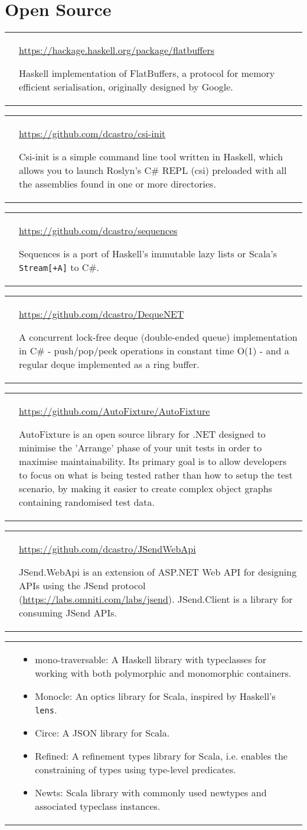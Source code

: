 \documentclass[12pt,a4paper,sans]{moderncv}        %
\makeatletter
\newcommand*{\para}{\vspace{.7ex}\newline}
\newcommand*{\project}[3]{
  \cvitem{\textbf{#1}}{
    \barelink{#2}
    \para
    #3
    }
}
\newcommand*{\code}{\texttt}
\newcommand*{\barelink}[1]{\protect\href{#1}{#1}}
\newcommand*{\cvitemspace}{1em}
\renewcommand*{\cvitem}[3][\cvitemspace]{%
  \begin{tabular}{@{}p{\hintscolumnwidth}@{\hspace{\separatorcolumnwidth}}p{\maincolumnwidth}@{}}%
    \raggedleft\hintstyle{#2} &{#3}%
  \end{tabular}%
  \par\addvspace{#1}}
\makeatother
\begin{document}
\section{Open Source}
\project{haskell-flatbuffers}{https://hackage.haskell.org/package/flatbuffers}{
  Haskell implementation of FlatBuffers, a protocol for memory efficient
  serialisation, originally designed by Google.
}
\project{csi-init}{https://github.com/dcastro/csi-init}{
  Csi-init is a simple command line tool written in Haskell, which allows you to
  launch Roslyn's C\# REPL (csi) preloaded with all the assemblies found in one or
  more directories.
}
\project{sequences}{https://github.com/dcastro/sequences}{
  Sequences is a port of Haskell's immutable lazy lists or Scala's \code{Stream[+A]} to C\#.
}
\project{DequeNET}{https://github.com/dcastro/DequeNET}{
  A concurrent lock-free deque (double-ended queue) implementation in C\# -
  push/pop/peek operations in constant time O(1) - and a regular deque
  implemented as a ring buffer.
}
\project{Contributed to AutoFixture}{https://github.com/AutoFixture/AutoFixture}{
  AutoFixture is an open source library for .NET designed to minimise the
  'Arrange' phase of your unit tests in order to maximise maintainability. Its
  primary goal is to allow developers to focus on what is being tested rather than
  how to setup the test scenario, by making it easier to create complex object graphs
  containing randomised test data.
}
\project{JSend WebApi \& Client}{https://github.com/dcastro/JSendWebApi}{
  JSend.WebApi is an extension of ASP.NET Web API for designing APIs using the
  JSend protocol (\barelink{https://labs.omniti.com/labs/jsend}).
  JSend.Client is a library for consuming JSend APIs.
}
\cvitem{\textbf{Smaller contributions}}{
  \begin{itemize}
    \item mono-traversable: A Haskell library with typeclasses for working with
    both polymorphic and monomorphic containers.
    \item Monocle: An optics library for Scala, inspired by Haskell's \code{lens}.
    \item Circe: A JSON library for Scala.
    \item Refined: A refinement types library for Scala, i.e. enables
    the constraining of types using type-level predicates.
    \item Newts: Scala library with commonly used newtypes and associated typeclass instances.
  \end{itemize}
}
\end{document}
